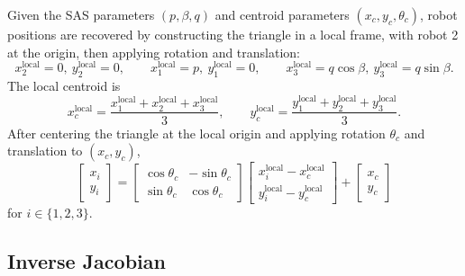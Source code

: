 \documentclass[12pt, letterpaper, oneside]{report}
\begin{document}
Given the SAS parameters $(p,\beta,q)$ and centroid parameters
$(x_c,y_c,\theta_c)$, robot positions are recovered by constructing the
triangle in a local frame, with robot 2 at the origin, then applying
rotation and translation:
\begin{equation}
x_2^{\text{local}}=0,\ y_2^{\text{local}}=0, \qquad
x_1^{\text{local}}=p,\ y_1^{\text{local}}=0, \qquad
x_3^{\text{local}}=q\cos\beta,\ y_3^{\text{local}}=q\sin\beta.
\end{equation}
The local centroid is
\begin{equation}
x_c^{\text{local}} = \frac{x_1^{\text{local}}+x_2^{\text{local}}+x_3^{\text{local}}}{3}, \qquad
y_c^{\text{local}} = \frac{y_1^{\text{local}}+y_2^{\text{local}}+y_3^{\text{local}}}{3}.
\end{equation}
After centering the triangle at the local origin and applying rotation
$\theta_c$ and translation to $(x_c,y_c)$,
\begin{equation}
\begin{bmatrix} x_i \\ y_i \end{bmatrix} =
\begin{bmatrix} \cos\theta_c & -\sin\theta_c \\ \sin\theta_c & \cos\theta_c \end{bmatrix}
\begin{bmatrix} x_i^{\text{local}}-x_c^{\text{local}} \\ y_i^{\text{local}}-y_c^{\text{local}} \end{bmatrix}
+ \begin{bmatrix} x_c \\ y_c \end{bmatrix}
\end{equation}
for $i\in\{1,2,3\}$.

\subsection{Inverse Jacobian}
\end{document}

